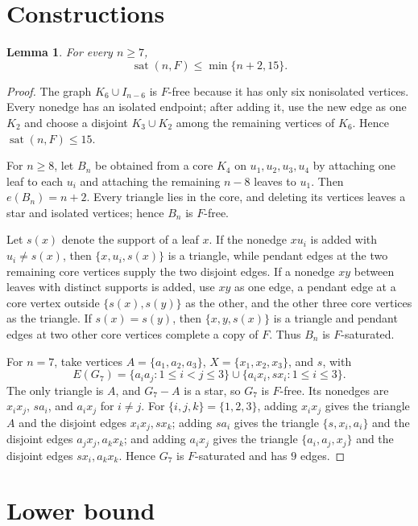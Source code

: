 \documentclass[11pt]{amsart}
\newtheorem{lemma}[theorem]{Lemma}
\DeclareMathOperator{\sat}{sat}
\begin{document}
\section{Constructions}

\begin{lemma}\label{lem:upper}
For every $n\ge7$,
\[
\sat(n,F)\le \min\{n+2,15\}.
\]
\end{lemma}

\begin{proof}
The graph $K_6\cup I_{n-6}$ is $F$-free because it has only six nonisolated
vertices. Every nonedge has an isolated endpoint; after adding it, use the new
edge as one $K_2$ and choose a disjoint $K_3\cup K_2$ among the remaining
vertices of $K_6$. Hence $\sat(n,F)\le15$.

For $n\ge8$, let $B_n$ be obtained from a core $K_4$ on
$u_1,u_2,u_3,u_4$ by attaching one leaf to each $u_i$ and attaching the
remaining $n-8$ leaves to $u_1$. Then $e(B_n)=n+2$. Every triangle lies in the
core, and deleting its vertices leaves a star and isolated vertices; hence
$B_n$ is $F$-free.

Let $s(x)$ denote the support of a leaf $x$. If the nonedge $xu_i$ is added with
$u_i\ne s(x)$, then $\{x,u_i,s(x)\}$ is a triangle, while pendant edges at the
two remaining core vertices supply the two disjoint edges. If a nonedge $xy$
between leaves with distinct supports is added, use $xy$ as one edge, a pendant
edge at a core vertex outside $\{s(x),s(y)\}$ as the other, and the other three
core vertices as the triangle. If $s(x)=s(y)$, then $\{x,y,s(x)\}$ is a
triangle and pendant edges at two other core vertices complete a copy of $F$.
Thus $B_n$ is $F$-saturated.

For $n=7$, take vertices
$A=\{a_1,a_2,a_3\}$, $X=\{x_1,x_2,x_3\}$, and $s$, with
\[
E(G_7)=\{a_ia_j:1\le i<j\le3\}\cup\{a_ix_i,sx_i:1\le i\le3\}.
\]
The only triangle is $A$, and $G_7-A$ is a star, so $G_7$ is $F$-free. Its
nonedges are $x_ix_j$, $sa_i$, and $a_ix_j$ for $i\ne j$. For
$\{i,j,k\}=\{1,2,3\}$, adding $x_ix_j$ gives the triangle $A$ and the disjoint
edges $x_ix_j,sx_k$; adding $sa_i$ gives the triangle $\{s,x_i,a_i\}$ and the
disjoint edges $a_jx_j,a_kx_k$; and adding $a_ix_j$ gives the triangle
$\{a_i,a_j,x_j\}$ and the disjoint edges $sx_i,a_kx_k$. Hence $G_7$ is
$F$-saturated and has $9$ edges.
\end{proof}

\section{Lower bound}
\end{document}
